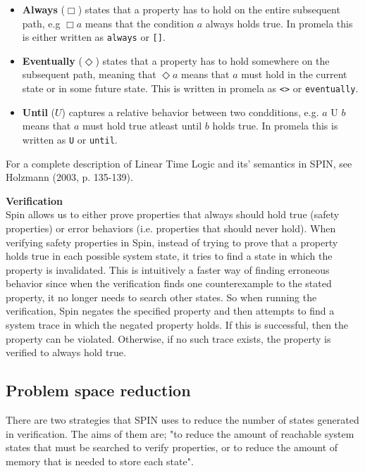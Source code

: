 \begin{itemize}
	\item[] \textbf{Always} ($\Box$) states that a property has to hold on the entire subsequent path, e.g $\Box a$ means that the condition $a$ always holds true. In promela this is either written as \texttt{always} or \texttt{[]}.
	\item[] \textbf{Eventually} ($\Diamond$) states that a property has to hold somewhere on the subsequent path, meaning that $\Diamond a$ means that $a$ must hold in the current state or in some future state. This is written in promela as \texttt{<>} or \texttt{eventually}.
	\item[] \textbf{Until} ($U$) captures a relative behavior between two condditions, e.g. $a \text{ U } b$ means that $a$ must hold true atleast until $b$ holds true. In promela this is written as \texttt{U} or \texttt{until}.
 \end{itemize}

For a complete description of Linear Time Logic and its' semantics in SPIN, see Holzmann (2003, p. 135-139).

\textbf{Verification} \\

Spin allows us to either prove properties that always should hold true (safety properties) or error behaviors (i.e. properties that should never hold). When verifying safety properties in Spin, instead of trying to prove that a property holds true in each possible system state, it tries to find a state in which the property is invalidated. This is intuitively a faster way of finding erroneous behavior since when the verification finds one counterexample to the stated property, it no longer needs to search other states. 
So when running the verification, Spin negates the specified property and then attempts to find a system trace in which the negated property holds. If this is successful, then the property can be violated. Otherwise, if no such trace exists, the property is verified to always hold true.

\subsection{Problem space reduction}


There are two strategies that SPIN uses to reduce the number of states generated in verification. The aims of them are; "to reduce the amount of reachable system states that must be searched to verify properties, or to reduce the amount of memory that is needed to store each state".

